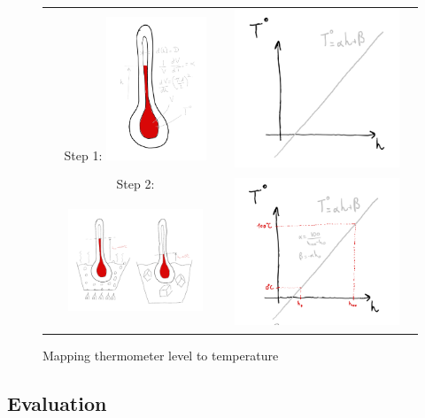 \begin{bibunit}
\begin{figure}[h]
\begin{tabular}{ccc}
    Step 1: \includegraphics[clip, width=3cm, width=3cm]{Introduction/pics/therm_theroy.png} &    \includegraphics[clip, width=5cm]{Introduction/pics/therm_model.png}     \\  
     Step 2: \includegraphics[clip, width=4cm, height=4cm, trim={2cm 1cm 2cm 2cm}]{Introduction/pics/therm_obs.png} &    \includegraphics[clip, width=5cm]{Introduction/pics/therm_calib.png}     \\  
\end{tabular}

    \caption{Mapping thermometer level to temperature}
    \label{fig:therm_mapping}
\end{figure}

\subsection{Evaluation}


\end{bibunit}
